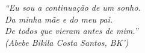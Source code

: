 \begin{epigrafe}
    \vspace*{\fill}
	\begin{flushright}


		\textit{``Eu sou a continuação de um sonho. \\
        Da minha mãe e do meu pai. \\
        De todos que vieram antes de mim.'' \\
        (Abebe Bikila Costa Santos, BK')}
	\end{flushright}
\end{epigrafe}
